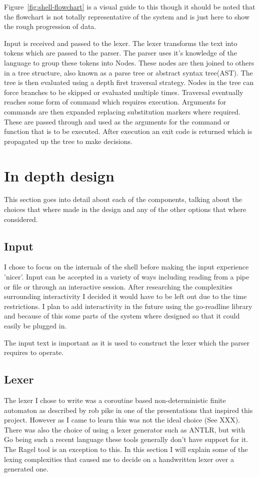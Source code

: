 Figure~\ref{fig:shell-flowchart} is a visual guide to this though it should be noted that the flowchart is not totally representative of the system and is just here to show the rough progression of data.

Input is received and passed to the lexer.
The lexer transforms the text into tokens which are passed to the parser.
The parser uses it's knowledge of the language to group these tokens into Nodes.
These nodes are then joined to others in a tree structure, also known as a parse tree or abstract syntax tree(AST).
The tree is then evaluated using a depth first traversal strategy.
Nodes in the tree can force branches to be skipped or evaluated multiple times.
Traversal eventually reaches some form of command which requires execution.
Arguments for commands are then expanded replacing substitution markers where required.
These are passed through and used as the arguments for the command or function that is to be executed.
After execution an exit code is returned which is propagated up the tree to make decisions.


\section{In depth design}
This section goes into detail about each of the components, talking about the choices that where made in the design and any of the other options that where considered.

\subsection{Input}
I chose to focus on the internals of the shell before making the input experience 'nicer'.
Input can be accepted in a variety of ways including reading from a pipe or file or through an interactive session.
After researching the complexities surrounding interactivity I decided it would have to be left out due to the time restrictions.
I plan to add interactivity in the future using the go-readline library\cite{GO-READLINE} and because of this some parts of the system where designed so that it could easily be plugged in.

The input text is important as it is used to construct the lexer which the parser requires to operate.

\subsection{Lexer}
The lexer I chose to write was a coroutine based non-deterministic finite automaton as described by rob pike in one of the presentations that inspired this project\cite{PIKE-LEXING-VIDEO}.
However as I came to learn this was not the ideal choice (See XXX).
There was also the choice of using a lexer generator such as ANTLR, but with Go being such a recent language these tools generally don't have support for it.
The Ragel tool is an exception to this.
In this section I will explain some of the lexing complexities that caused me to decide on a handwritten lexer over a generated one.

